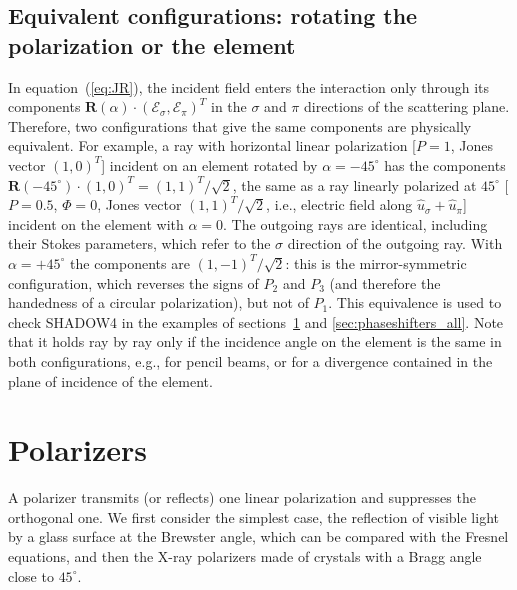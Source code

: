 \documentclass{iucr}
\begin{document}
\subsection{Equivalent configurations: rotating the polarization or the element}\label{sec:equivalence}

In equation~(\ref{eq:JR}), the incident field enters the interaction only through its components $\textbf{R}(\alpha)\cdot(\mathcal{E}_\sigma,\mathcal{E}_\pi)^T$ in the $\sigma$ and $\pi$ directions of the scattering plane. Therefore, two configurations that give the same components are physically equivalent. For example, a ray with horizontal linear polarization [$P=1$, Jones vector $(1,0)^T$] incident on an element rotated by $\alpha=-45^\circ$ has the components $\textbf{R}(-45^\circ)\cdot(1,0)^T=(1,1)^T/\sqrt{2}$, the same as a ray linearly polarized at $45^\circ$ [$P=0.5$, $\Phi=0$, Jones vector $(1,1)^T/\sqrt{2}$, i.e., electric field along $\hat{u}_\sigma+\hat{u}_\pi$] incident on the element with $\alpha=0$. The outgoing rays are identical, including their Stokes parameters, which refer to the $\sigma$ direction of the outgoing ray. With $\alpha=+45^\circ$ the components are $(1,-1)^T/\sqrt{2}$: this is the mirror-symmetric configuration, which reverses the signs of $P_2$ and $P_3$ (and therefore the handedness of a circular polarization), but not of $P_1$.
This equivalence is used to check SHADOW4 in the examples of sections~\ref{sec:polarizers_all} and \ref{sec:phaseshifters_all}. Note that it holds ray by ray only if the incidence angle on the element is the same in both configurations, e.g., for pencil beams, or for a divergence contained in the plane of incidence of the element.


\section{Polarizers}\label{sec:polarizers_all}

A polarizer transmits (or reflects) one linear polarization and suppresses the orthogonal one. We first consider the simplest case, the reflection of visible light by a glass surface at the Brewster angle, which can be compared with the Fresnel equations, and then the X-ray polarizers made of crystals with a Bragg angle close to $45^\circ$.
\end{document}
